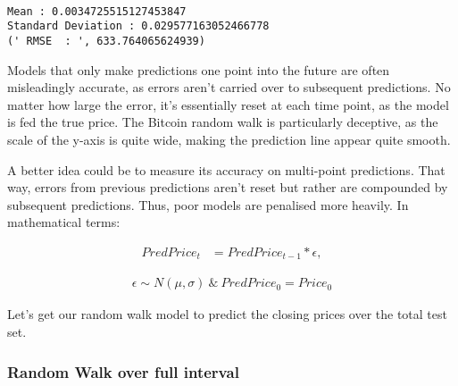 \documentclass[11pt]{article}
\begin{document}
    \begin{center}
    \end{center}
    { \hspace*{\fill} \\}
    
    \begin{Verbatim}[commandchars=\\\{\}]
Mean : 0.0034725515127453847 
Standard Deviation : 0.029577163052466778
(' RMSE  : ', 633.764065624939)

    \end{Verbatim}

    Models that only make predictions one point into the future are often
misleadingly accurate, as errors aren't carried over to subsequent
predictions. No matter how large the error, it's essentially reset at
each time point, as the model is fed the true price. The Bitcoin random
walk is particularly deceptive, as the scale of the y-axis is quite
wide, making the prediction line appear quite smooth.

A better idea could be to measure its accuracy on multi-point
predictions. That way, errors from previous predictions aren't reset but
rather are compounded by subsequent predictions. Thus, poor models are
penalised more heavily. In mathematical terms:

\begin{align}
PredPrice_{t} & = PredPrice_{t-1} * \epsilon   ,
\end{align}

\begin{align}
    \epsilon \sim N(\mu, \sigma)\ \&  \ PredPrice_0 = Price_0
\end{align}

Let's get our random walk model to predict the closing prices over the
total test set.

    \subsubsection{Random Walk over full
interval}\label{random-walk-over-full-interval}
\end{document}
